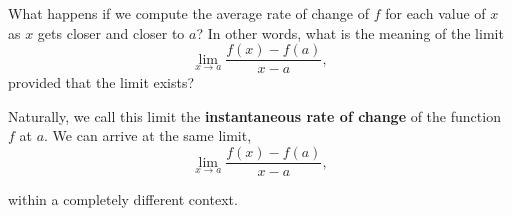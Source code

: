 \documentclass{ximera}
\begin{document}
\begin{comment}
Suppose the difference between $x$ and $a$
 is some small number $h$. That is $x−a=h$
 or $x=a+h$. Substituting this in to our slope formula gives us an alternate characterization of the slope of a secant line.

\[ARC=\frac{f(a+h)-f(a)}{(a+h)-a}=\frac{f(a+h)-f(a)}{h}\]

 \begin{example}
     If $f(x)=x^2-2x$, find the slope of the secant line through $x=2$ and $x=2+h$, in terms of $h$.
     \begin{explanation}
         Start with the slope formula we just found.
         \[ARC=\frac{f(\answer[given]{2+h}-f(2)}{\answer[given]{h}}.\]
     Now substitute in for the function we know,
     \[ARC=\frac{\answer[given]{(2+h)^2-2(2+h)}-0}{h}.\]

     Now expand the numerator of the fraction,
     \[ARC=\frac{4+4h+h^2-4-2h}{h}.\]

     Now combine like terms,
     \[ARC=\frac{2h+h^2}{h}.\]
Factor an $h$ from each term in the numerator,
\[ARC=\frac{h(\answer[given]{2+h})}{h}.\]
Cancel $h$ from the numerator and denominator,
\[ARC=\answer[given]{2+h}\]
     \end{explanation}
 \end{example}
\end{comment}
 
What happens if we compute the average rate of change of $f$  for each value of $x$ as $x$ gets closer and closer to $a$? In other words, what is the meaning of the limit
\[
     \lim_{x\to a} \frac{f(x)-f(a)}{x-a},
    \] 
    provided that the limit exists?
    
Naturally, we call this limit the \textbf{instantaneous rate of change} of the function $f$ at $a$.
We can arrive at the same limit,
\[
     \lim_{x\to a} \frac{f(x)-f(a)}{x-a},
    \] 

 within a completely different context.
\end{document}
